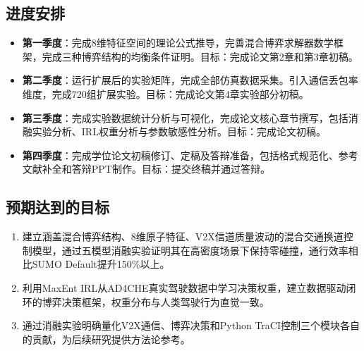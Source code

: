 \subsection{进度安排}
\begin{itemize}
    \item \textbf{第一季度}：完成8维特征空间的理论公式推导，完善混合博弈求解器数学框架，完成三种博弈结构的均衡条件证明。目标：完成论文第2章和第3章初稿。
    \item \textbf{第二季度}：运行扩展后的实验矩阵，完成全部仿真数据采集。引入通信丢包率维度，完成720组扩展实验。目标：完成论文第4章实验部分初稿。
    \item \textbf{第三季度}：完成实验数据统计分析与可视化，完成论文核心章节撰写，包括消融实验分析、IRL权重分析与参数敏感性分析。目标：完成论文初稿。
    \item \textbf{第四季度}：完成学位论文初稿修订、定稿及答辩准备，包括格式规范化、参考文献补全和答辩PPT制作。目标：提交终稿并通过答辩。
\end{itemize}

\subsection{预期达到的目标}
\begin{enumerate}
    \item 建立涵盖混合博弈结构、8维原子特征、V2X信道质量波动的混合交通换道控制模型，通过五模型消融实验证明其在高密度场景下保持零碰撞，通行效率相比SUMO Default提升150\%以上。
    \item 利用MaxEnt IRL从AD4CHE真实驾驶数据中学习决策权重，建立数据驱动闭环的博弈决策框架，权重分布与人类驾驶行为直觉一致。
    \item 通过消融实验明确量化V2X通信、博弈决策和Python TraCI控制三个模块各自的贡献，为后续研究提供方法论参考。
\end{enumerate}


